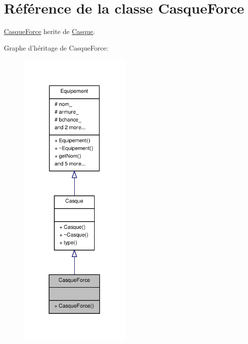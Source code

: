 \hypertarget{class_casque_force}{\section{Référence de la classe Casque\-Force}
\label{class_casque_force}
}


\hyperlink{class_casque_force}{Casque\-Force} herite de \hyperlink{class_casque}{Casque}.  




Graphe d'héritage de Casque\-Force\-:
\nopagebreak
\begin{figure}[H]
\begin{center}
\leavevmode
\includegraphics[width=158pt]{class_casque_force__inherit__graph}
\end{center}
\end{figure}


